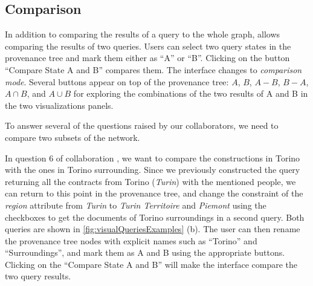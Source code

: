 \subsection{Comparison}

In addition to comparing the results of a query to the whole graph, \name allows comparing the results of two queries.
Users can select two query states in the provenance tree and mark them either as ``A'' or ``B''.
Clicking on the button ``Compare State A and B'' compares them.
The interface changes to \emph{comparison mode}.
Several buttons appear on top of the provenance tree: $A$, $B$, $A-B$, $B-A$, $A \cap B$, and $A \cup B$ for exploring the combinations of the two results of A and B in the two visualizations panels.

To answer several of the questions raised by our collaborators, we need to compare two subsets of the network.

In question 6 of collaboration \pascal, we want to compare the constructions in Torino with the ones in Torino surrounding.
Since we previously constructed the query returning all the contracts from Torino (\textit{Turin}) with the mentioned people, we can
return to this point in the provenance tree, and change the constraint of the \textit{region} attribute from \textit{Turin} to \textit{Turin Territoire} and \textit{Piemont} using the checkboxes to get the documents of Torino surroundings in a second query.
Both queries are shown in \autoref{fig:visualQueriesExamples} (b).
The user can then rename the provenance tree nodes with explicit names such as ``Torino'' and ``Surroundings'', and mark them as A and B using the appropriate buttons.
Clicking on the ``Compare State A and B'' will make the interface compare the two query results.



